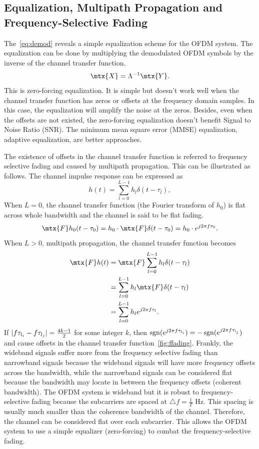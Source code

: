 \subsection{Equalization, Multipath Propagation and Frequency-Selective Fading}
The~\cref{eq:demod} reveals a simple equalization scheme for the OFDM system. The equalization can be done by multiplying the demodulated OFDM symbols by the inverse of the channel transfer function.
\begin{equation}
    \mtx{X} = \Lambda^{-1}\mtx{Y}.
\end{equation}
This is zero-forcing equalization. It is simple but doesn't work well when the channel transfer function has zeros or offsets at the frequency domain samples. In this case, the equalization will amplify the noise at the zeros. Besides, even when the offsets are not existed, the zero-forcing equalization doesn't benefit Signal to Noise Ratio (SNR). The minimum mean square error (MMSE) equalization, adaptive equalization, \etc are better approaches.

The existence of offsets in the channel transfer function is referred to frequency selective fading and caused by multipath propagation. This can be illustrated as follows. The channel impulse response can be expressed as
\begin{equation}
    h(t) = \sum_{l=0}^{L-1}h_l\delta(t-\tau_l),
\end{equation}
When $L=0$, the channel transfer function (the Fourier transform of $h_0$) is flat across whole bandwidth and the channel is said to be flat fading.
\begin{equation}
    \mtx{F}h_0(t-\tau_0) = h_0\cdot\mtx{F}\delta(t-\tau_0) = h_0\cdot e^{j2\pi f\tau_0}.
\end{equation}
When $L>0$, \aka multipath propagation, the channel transfer function becomes
\begin{equation}
    \begin{aligned}
        \mtx{F}h(t)
        &= \mtx{F}\sum_{l=0}^{L-1}h_l\delta(t-\tau_l) \\
        &= \sum_{l=0}^{L-1}h_l\mtx{F}\delta(t-\tau_l) \\
        &= \sum_{l=0}^{L-1}h_l e^{j2\pi f\tau_l}.
    \end{aligned}
\end{equation}
If $\lvert f\tau_{l_i}-f\tau_{l_j}\rvert=\frac{4k-1}{2}$ for some integer $k$, then $\operatorname{\mathrm{sgn}}(e^{j2\pi f\tau_{l_i}})=-\operatorname{\mathrm{sgn}}(e^{j2\pi f\tau_{l_j}})$ and cause offsets in the channel transfer function~\cref{fig:ffading}. Frankly, the wideband signals suffer more from the frequency selective fading than narrowband signals because the wideband signals will have more frequency offsets across the bandwidth, while the narrowband signals can be considered flat because the bandwidth may locate in between the frequency offsets (\aka coherent bandwidth). The OFDM system is wideband but it is robust to frequency-selective fading because the subcarriers are spaced at $\triangle f=\frac{1}{T}$ Hz. This spacing is usually much smaller than the coherence bandwidth of the channel. Therefore, the channel can be considered flat over each subcarrier. This allows the OFDM system to use a simple equalizer (\ie zero-forcing) to combat the frequency-selective fading.


